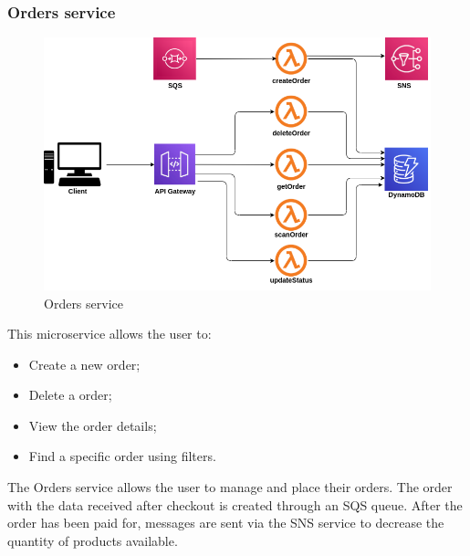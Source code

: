 \subsubsection{Orders service}
\begin{figure}[!h]
    \vspace{5px}
    \includegraphics[scale=0.5]{../../../../Images/Diagrammi/maintainerManual/orderService.png}
    \centering
    \caption{Orders service}
\end{figure}
This microservice allows the user to:
\begin{itemize}
    \item Create a new order;
    \item Delete a order;
    \item View the order details;
    \item Find a specific order using filters.
\end{itemize}
The Orders service allows the user to manage and place their orders.
The order with the data received after checkout is created through an SQS queue. After the order has been paid for, messages are sent via the SNS service to decrease the quantity of products available.
\pagebreak
